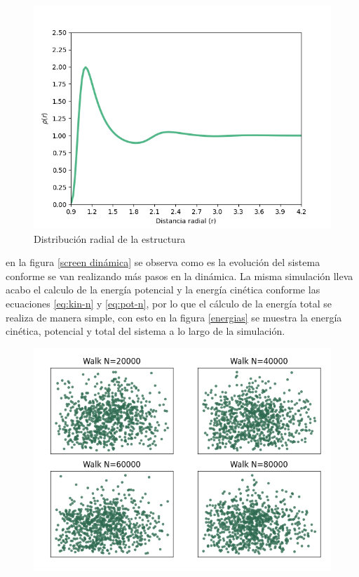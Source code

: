 \documentclass[12pt,letterpaper]{article}
\begin{document}
\begin{multicols}{2}
\begin{figure}[H]
    \centering
    \includegraphics[scale=0.48]{../Graphics/Dis_rad.png}
    \caption{Distribución radial de la estructura}
    \label{distribución radial}
\end{figure}
en la figura \ref{screen dinámica} se observa como es la evolución del sistema conforme se van realizando más pasos en la dinámica. 
La misma simulación lleva acabo el calculo de la energía potencial y la energía cinética conforme las ecuaciones \ref{eq:kin-n} y \ref{eq:pot-n}, por lo que el cálculo de la energía total se realiza de manera simple, con esto en la figura \ref{energias} se muestra la energía cinética, potencial y total del sistema a lo largo de la simulación.
\begin{figure}[H]
    \centering
    \includegraphics[scale=0.48]{../Graphics/Dim_Graphics.png}

\end{figure}
\end{multicols}
\end{document}
